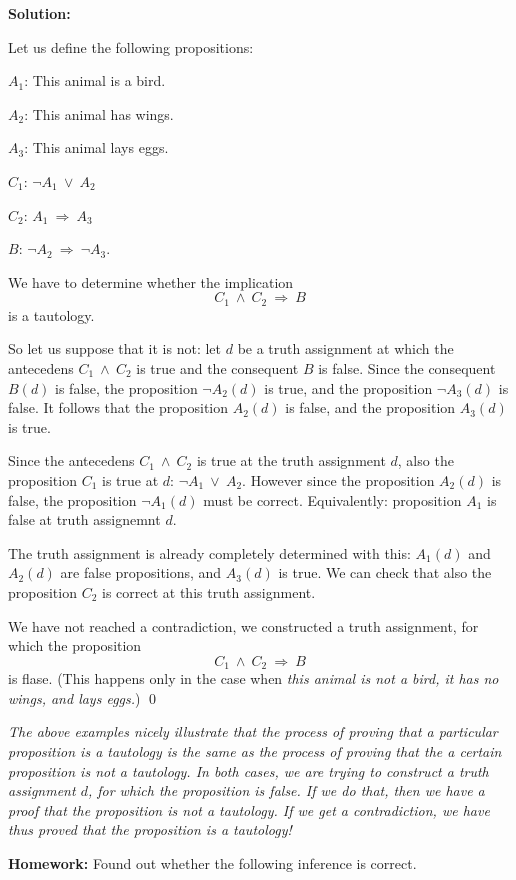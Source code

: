 \documentclass[11pt,paper=b5,footinclude,headinclude]{scrbook} %
\def\ali {{~\vee~}}
\def\inn {{~\wedge~}}
\def\sledi {{~\Rightarrow~}}
\theoremstyle{remark}
\theoremstyle{definition} %
\theoremstyle{theorem} %
\begin{document}
\medskip
\textbf{ Solution:}

Let us define the following propositions:

$A_1$: This animal is a bird.

$A_2$: This animal has wings.

$A_3$: This animal lays eggs.

$C_1$: $\neg A_1\ali A_2$

$C_2$: $A_1\sledi A_3$

$B$: $\neg A_2\sledi \neg A_3$.

We have to determine whether the implication
$$C_1\inn C_2\sledi B$$
is a tautology.

So let us suppose that it is not: let $d$ be a truth assignment at which the antecedens
$C_1\inn C_2$ is true and the consequent $B$ is false.
Since the consequent $B(d)$ is false, the proposition $\neg A_2(d)$ is true, and the proposition
$\neg A_3 (d)$ is false. It follows that the proposition $A_2(d)$ is false, and the proposition
$A_3(d)$ is true.

Since the antecedens $C_1\inn C_2$ is true at the truth assignment $d$, also the proposition $C_1$ is true at $d$: $\neg A_1\ali A_2$.
However since the proposition $A_2(d)$ is false, the proposition
$\neg A_1(d)$ must be correct. Equivalently: proposition $A_1$ is false at truth assignemnt $d$.

The truth assignment is already completely determined with this: $A_1(d)$ and $A_2(d)$ are false propositions, and
$A_3(d)$ is true. We can check that also the proposition $C_2$ is correct at this truth assignment.

We have not reached a contradiction, we constructed a truth assignment, for which the proposition $$C_1\inn C_2\sledi B$$
is flase. (This happens only in the case when {\em this animal is not a bird, it has no wings, and lays eggs.})
\qed

\medskip
\begin{sloppypar}
{\em The above examples nicely illustrate that the process of proving that a particular proposition is a tautology is  the same as the process of proving  that the a certain proposition is not a tautology. In both cases, we are trying to construct a truth assignment $d$, for which the proposition is false.
If we do that, then we have a proof that the proposition is not a tautology. If we get a contradiction, we have thus proved that the proposition is a tautology!}
\end{sloppypar}

\bigskip
\textbf{ Homework:}
Found out whether the following inference is correct.
\end{document}
